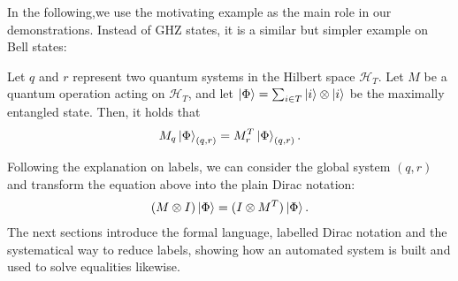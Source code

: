 In the following,we use the motivating example as the main role in our demonstrations.
Instead of GHZ states, it is a similar but simpler example on Bell states:
\begin{example}
    \label{ex: motivating}
    Let \( q \) and \( r \) represent two quantum systems in the Hilbert space \( \mathcal{H}_T \). Let \( M \) be a quantum operation acting on \( \mathcal{H}_T \), and let \( \ket{\Phi} = \sum_{i \in T} \ket{i} \otimes \ket{i} \) be the maximally entangled state. Then, it holds that
    \[
    M_q \ket{\Phi}_{(q, r)} = M_r^T \ket{\Phi}_{(q, r)}.
    \]
\end{example}
Following the explanation on labels, we can consider the global system $(q,r)$ and transform the equation above into the plain Dirac notation:
\begin{align}
    (M \otimes I) \ket{\Phi} = (I \otimes M^T) \ket{\Phi}.
    \label{eq: motivating plain}
\end{align}
The next sections introduce the formal language, labelled Dirac notation and the systematical way to reduce labels, showing how an automated system is built and used to solve equalities likewise.




